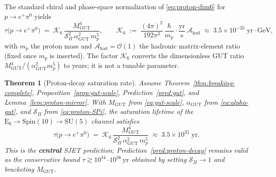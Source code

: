 \documentclass[11pt]{article}
\theoremstyle{plain}
\newtheorem{theorem}{Theorem}[section]
\theoremstyle{definition}
\theoremstyle{remark}
\numberwithin{equation}{section}
\newcommand{\E}[1]{\mathrm{E}_{#1}}
\newcommand{\Spin}{\mathrm{Spin}}
\begin{document}
The standard chiral and phase-space normalization of \eqref{eq:proton-dim6}
for $p\to e^+\pi^0$ yields~\cite{GeorgiGlashow1974,Witten1985}
\begin{equation}\label{eq:proton-rate}
  \tau\!\bigl(p\to e^+\pi^0\bigr)
  \;=\;
  \mathcal{K}_{6}\,
  \frac{M_{\mathrm{GUT}}^{4}}
       {\mathcal{S}_\Pi^{2}\,\alpha_{\mathrm{GUT}}^{2}\,m_{p}^{5}},
  \qquad
  \mathcal{K}_{6}
  \;:=\;
  \frac{(4\pi)^2}{192\pi^3}\,
  \frac{\hbar}{m_{p}}\cdot\frac{\mathrm{yr}}{\mathrm{s}}\,
  \mathcal{A}_{\mathrm{had}}
  \;\approx\;
  3.5\times 10^{-35}\;\mathrm{yr\cdot GeV},
\end{equation}
with $m_p$ the proton mass and $\mathcal{A}_{\mathrm{had}}=\mathcal{O}(1)$ the
hadronic matrix-element ratio (fixed once $m_p$ is inserted). The factor
$\mathcal{K}_{6}$ converts the dimensionless GUT ratio
$M_{\mathrm{GUT}}^{4}/(\alpha_{\mathrm{GUT}}^{2}m_{p}^{5})$ to years; it is
not a tunable parameter.

\begin{theorem}[Proton-decay saturation rate]\label{thm:proton-decay-rate}
Assume Theorem~\ref{thm:breaking-complete},
Proposition~\ref{prop:gut-scale}, Prediction~\ref{pred:gut}, and
Lemma~\ref{lem:proton-mirror}. With $M_{\mathrm{GUT}}$ from
\eqref{eq:gut-scale}, $\alpha_{\mathrm{GUT}}$ from \eqref{eq:alpha-gut}, and
$\mathcal{S}_\Pi$ from \eqref{eq:proton-SPi}, the saturation lifetime of the
$\E{6}\to\Spin(10)\to\mathrm{SU}(5)$ channel satisfies
\begin{equation}\label{eq:proton-tau-sat}
  \tau\!\bigl(p\to e^+\pi^0\bigr)
  \;=\;
  \mathcal{K}_{6}\,
  \frac{M_{\mathrm{GUT}}^{4}}
       {\mathcal{S}_\Pi^{2}\,\alpha_{\mathrm{GUT}}^{2}\,m_{p}^{5}}
  \;\approx\;
  3.5\times 10^{35}\;\mathrm{yr}.
\end{equation}
This is the \textbf{central} SJET prediction; Prediction~\ref{pred:proton-decay}
remains valid as the conservative bound
$\tau\gtrsim 10^{34}$--$10^{36}\,\mathrm{yr}$ obtained by setting
$\mathcal{S}_\Pi\to 1$ and bracketing $M_{\mathrm{GUT}}$.
\end{theorem}
\end{document}
